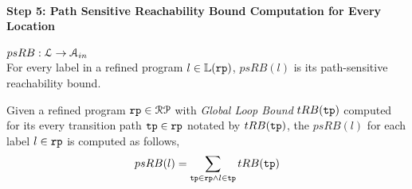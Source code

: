   \paragraph{Step 5: Path Sensitive Reachability Bound Computation for Every Location}
  $psRB : \mathcal{L} \to \mathcal{A}_{in}$
  \\
  For every label in a refined program $l \in \mathbb{L}(\mathtt{rp})$,
   $psRB(l)$ is its path-sensitive reachability bound.
   \\
   \begin{defn}
   \label{def:label_psrb}
  Given a refined program $\mathtt{rp} \in \mathcal{RP}$ with 
  \emph{Global Loop Bound} $tRB(\mathtt{tp})$
  computed for its every transition path $\mathtt{tp} \in \mathtt{rp}$ notated by $tRB(\mathtt{tp})$,
  the $psRB(l)$ for each label $l \in \mathtt{rp}$ is computed as follows,
  \\
  \[ psRB(l) = \sum\limits_{\mathtt{tp} \in \mathtt{rp} \land 
  l \in \mathtt{tp}} tRB(\mathtt{tp})\]
   \end{defn}